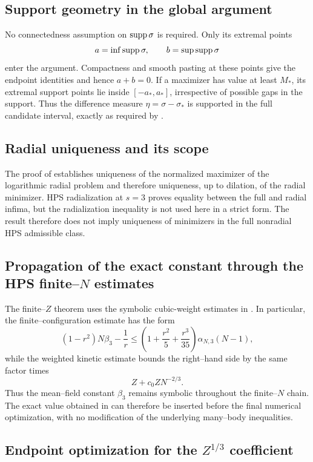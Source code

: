 \subsection{Support geometry in the global argument}

No connectedness assumption on $\operatorname{supp}\sigma$ is required.  Only its extremal points
\[
 a=\inf\operatorname{supp}\sigma,
 \qquad
 b=\sup\operatorname{supp}\sigma
\]
enter the argument.  Compactness and smooth pasting at these points give the endpoint identities and hence $a+b=0$.  If a maximizer has value at least $M_*$, its extremal support points lie inside $[-a_*,a_*]$, irrespective of possible gaps in the support.  Thus the difference measure $\eta=\sigma-\sigma_*$ is supported in the full candidate interval, exactly as required by .

\subsection{Radial uniqueness and its scope}

The proof of  establishes uniqueness of the normalized maximizer of the logarithmic radial problem and therefore uniqueness, up to dilation, of the radial minimizer.  HPS radialization at $s=3$ proves equality between the full and radial infima, but the radialization inequality is not used here in a strict form.  The result therefore does not imply uniqueness of minimizers in the full nonradial HPS admissible class.

\subsection{Propagation of the exact constant through the HPS finite--$N$ estimates}

The finite--$Z$ theorem uses the symbolic cubic-weight estimates in \cite[Sec.~7.3]{HPS2025}.  In particular, the finite--configuration estimate has the form
\[
 (1-r^2)N\beta_3-\frac1r
 \le
 \left(1+\frac{r^2}{5}+\frac{r^3}{35}\right)\alpha_{N,3}(N-1),
\]
while the weighted kinetic estimate bounds the right--hand side by the same factor times
\[
 Z+c_0ZN^{-2/3}.
\]
Thus the mean--field constant $\beta_3$ remains symbolic throughout the finite--$N$ chain.  The exact value obtained in  can therefore be inserted before the final numerical optimization, with no modification of the underlying many--body inequalities.

\subsection{Endpoint optimization for the $Z^{1/3}$ coefficient}

